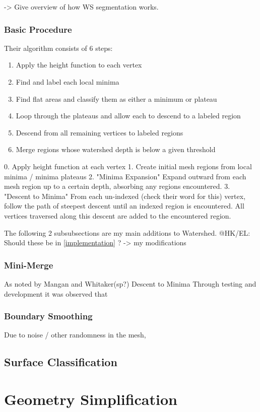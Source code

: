 -> Give overview of how WS segmentation works.
\subsubsection{Basic Procedure}
Their algorithm consists of 6 steps:
\begin{enumerate}
	\item Apply the height function to each vertex
	\item Find and label each local minima
	\item Find flat areas and classify them as either a minimum or plateau
	\item Loop through the plateaus and allow each to descend to a labeled region
	\item Descend from all remaining vertices to labeled regions
	\item Merge regions whose watershed depth is below a given threshold
\end{enumerate}

0. Apply height function at each vertex
1. Create initial mesh regions from local minima / minima plateaus
2. "Minima Expansion" Expand outward from each mesh region up to a certain depth, absorbing any regions encountered.
3. "Descent to Minima" From each un-indexed (check their word for this) vertex, follow the path of steepest descent until an indexed region is encountered.
All vertices traversed along this descent are added to the encountered region.

The following 2 subsubsections are my main additions to Watershed. @HK/EL: Should these be in \ref{implementation} ?
-> my modifications
\subsubsection{Mini-Merge}
As noted by Mangan and Whitaker(sp?) Descent to Minima Through testing and development it was observed that

\subsubsection{Boundary Smoothing}
Due to noise / other randomness in the mesh,

\subsection{Surface Classification}

\section{Geometry Simplification}


